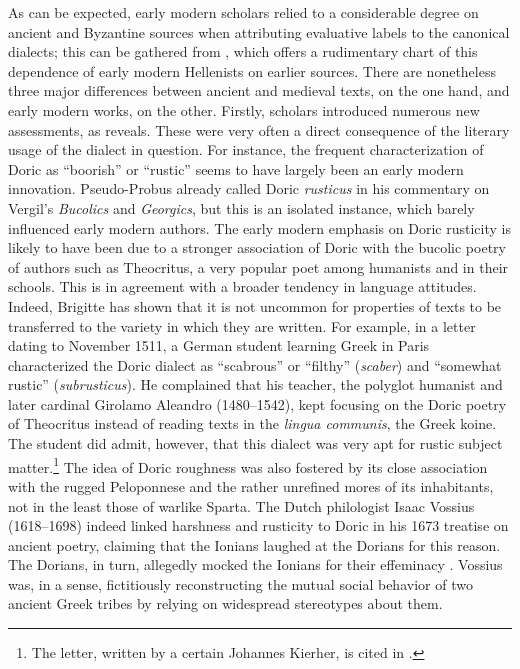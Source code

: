 As can be expected, early modern scholars relied to a considerable degree on ancient and Byzantine sources when attributing evaluative labels to the canonical dialects; this can be gathered from , which offers a rudimentary chart of this dependence of early modern Hellenists on earlier sources. There are nonetheless three major differences between ancient and medieval texts, on the one hand, and early modern works, on the other. Firstly, scholars introduced numerous new assessments, as  reveals. These were very often a direct consequence of the literary usage of the dialect in question. For instance, the frequent characterization of Doric as “boorish” or “rustic” seems to have largely been an early modern innovation. Pseudo-Probus already called Doric \textit{rusticus} in his commentary on Vergil’s \textit{Bucolics} and \textit{Georgics}, but this is an isolated instance, which barely influenced early modern authors. The early modern emphasis on Doric rusticity is likely to have been due to a stronger association of Doric with the bucolic poetry of authors such as Theocritus, a very popular poet among humanists and in their schools. This is in agreement with a broader tendency in language attitudes. Indeed, Brigitte \citet{Schlieben-lange1992} has shown that it is not uncommon for properties of texts to be transferred to the variety in which they are written. For example, in a letter dating to November 1511, a German student learning Greek in Paris characterized the Doric dialect as “scabrous” or “filthy” (\textit{scaber}) and “somewhat rustic” (\textit{subrusticus}). He complained that his teacher, the polyglot humanist and later cardinal Girolamo Aleandro (1480–1542), kept focusing on the Doric poetry of Theocritus instead of reading texts in the \textit{lingua communis}, the Greek koine. The student did admit, however, that this dialect was very apt for rustic subject matter.\footnote{The letter, written by a certain Johannes Kierher, is cited in \citet[220 n.435; cf. also p. 103]{Botley2010}.} The idea of Doric roughness was also fostered by its close association with the rugged Peloponnese and the rather unrefined mores of its inhabitants, not in the least those of warlike Sparta. The Dutch philologist Isaac Vossius (1618–1698) indeed linked harshness and rusticity to Doric in his 1673 treatise on ancient poetry, claiming that the Ionians laughed at the Dorians for this reason. The Dorians, in turn, allegedly mocked the Ionians for their effeminacy \citep[55]{Vossius1673}. Vossius was, in a sense, fictitiously reconstructing the mutual social behavior of two ancient Greek tribes by relying on widespread stereotypes about them.

